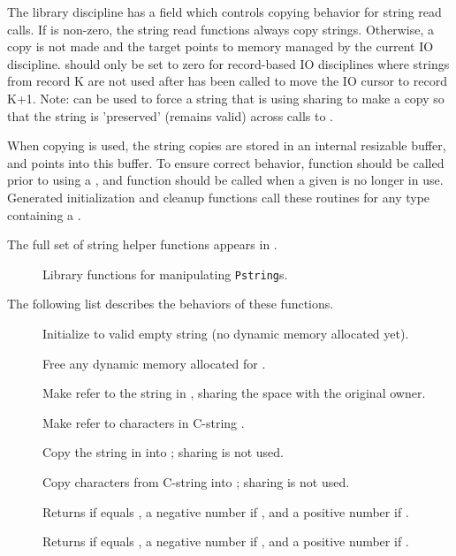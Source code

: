 The library discipline has a field  which controls
copying behavior for string read calls.  If  is
non-zero, the string read functions always copy strings. Otherwise, a
copy is not made and the target  points to memory managed by
the current IO discipline.   should only be set to
zero for record-based IO disciplines where strings from record K are
not used after  has been called to move the IO cursor
to record K+1.  Note:  can be used to force
a string that is using sharing to make a copy so that the string is
'preserved' (remains valid) across calls to .

When copying is used, the string copies are stored in an internal
resizable buffer, and  points into this buffer. 
To ensure correct behavior, function  should be called
prior to using a , and function  should
be called when a given  is no longer in use.
Generated initialization and cleanup functions call these routines for
any \pads{} type containing a .

The full set of string helper functions appears in .
\begin{figure}
\caption{Library functions for manipulating \texttt{Pstring}s.}
\label{fig:string-functions}
\end{figure}

The following list describes the behaviors of these functions.
\begin{description}
\item[] 
  Initialize  to valid empty string (no dynamic memory allocated yet).
\item[] 
  Free any dynamic memory allocated for .
\item[] 
  Make  refer to the string in , sharing the space with the original owner.
\item[] 
  Make  refer to  characters in C-string .
\item[]
  Copy the string in  into ; sharing is not used.
\item[] 
 Copy  characters from C-string  into ; sharing is not used.
\item[] 
 Returns  if  equals , a negative number if ,
 and a positive number if .
\item[]
 Returns  if  equals , a negative number if ,
 and a positive number if .
\end{description}

